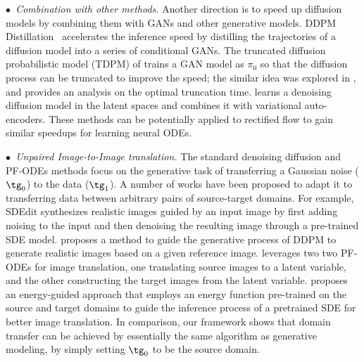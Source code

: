 \documentclass[11pt]{article}
\begin{document}
\emph{$\bullet$~Combination with other methods.}
 Another direction is to speed up diffusion models by combining them with GANs and other generative models. 
DDPM Distillation~\citep{luhman2021knowledge}
accelerates the inference speed 
by distilling the trajectories of a diffusion model into a series of conditional GANs. 
The truncated diffusion probabilistic model (TDPM) of \citep{zheng2022truncated}
trains a GAN model as $\pi_0$ so that the diffusion process can be truncated to improve the speed; 
the similar idea was explored in \cite{lyu2022accelerating, franzese2022much}, 
and \citep{franzese2022much} provides an analysis on the optimal truncation time.  
\citep{sinha2021d2c, wehenkel2021diffusion, vahdat2021score} learns a denoising diffusion model in the latent spaces and combines it with variational auto-encoders. 
These methods can be potentially applied to rectified flow to gain similar speedups for learning neural ODEs.   

\emph{$\bullet$~Unpaired Image-to-Image translation.} 
The standard denoising diffusion and PF-ODEs methods focus on the generative task of transferring a Gaussian noise ($\tg_0$) to the data ($\tg_1$). A number of works have been proposed to 
adapt it to transferring data between arbitrary pairs of source-target domains. 
For example, 
SDEdit \cite{meng2021sdedit} 
synthesizes realistic images 
guided by an input image by 
first adding noising to the input and then denoising the resulting image through 
a pre-trained SDE model. 
\cite{choi2021ilvr} proposes 
a method to guide the generative process of DDPM to generate realistic images based on a given reference image.  
\cite{su2022dual} leverages two 
two PF-ODEs for image translation, 
one translating source images to a latent variable, and the other constructing  the target images from the latent variable.  
\cite{zhao2022egsde} proposes 
an energy-guided approach that employs an energy function pre-trained on the source and target domains to guide the inference process of a pretrained SDE for better image translation. 
In comparison, 
our framework shows that domain transfer 
can be achieved by essentially the same algorithm as generative modeling, by simply setting $\tg_0$ to be the source domain. %
\end{document}
